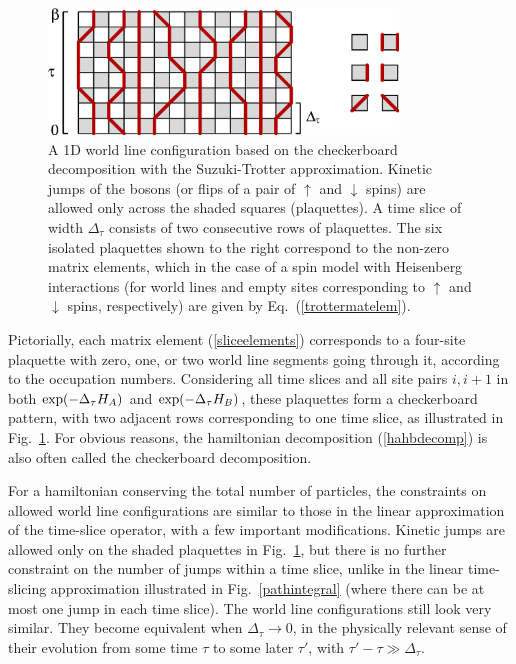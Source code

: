 \documentclass[draft,numberedheadings]{aipproc}
\newcommand{\dn}{\downarrow}
\newcommand{\up}{\uparrow}
\begin{document}
\begin{figure}
\includegraphics[width=9.3cm]{checkerboard.eps}
\caption{A 1D world line configuration based on the checkerboard decomposition with the Suzuki-Trotter approximation. Kinetic jumps of the bosons (or flips
of a pair of $\up$ and $\dn$ spins) are allowed only across the shaded squares (plaquettes). A time slice of width $\Delta_\tau$ consists of two consecutive 
rows of plaquettes. The six isolated plaquettes shown to the right correspond to the non-zero matrix elements, which in the case of a spin model with Heisenberg 
interactions (for world lines and empty sites corresponding to $\up$ and $\dn$ spins, respectively) are given by Eq.~(\ref{trottermatelem}).}
\label{checkerboard}
\end{figure}

Pictorially, each matrix element (\ref{sliceelements}) corresponds to a four-site plaquette with zero, one, or two world line segments going through it, according 
to the occupation numbers. Considering all time slices and all site pairs $i,i+1$ in both ${\rm exp}{(-\Delta_\tau H_A)}$ and ${\rm exp}{(-\Delta_\tau H_B)}$, these 
plaquettes form a checkerboard pattern, with two adjacent rows corresponding to one time slice, as illustrated in Fig.~\ref{checkerboard}. For obvious reasons, the 
hamiltonian decomposition (\ref{hahbdecomp}) is also often called the checkerboard decomposition. 

For a hamiltonian conserving the total number of particles, the constraints on allowed world line configurations are similar to those in the linear approximation 
of the time-slice operator, with a few important modifications. Kinetic jumps are allowed only on the shaded plaquettes in Fig.~\ref{checkerboard}, but there is 
no further constraint on the number of jumps within a time slice, unlike in the linear time-slicing approximation illustrated in 
Fig.~\ref{pathintegral} (where there can be at most one jump in each time slice). The world line configurations still look very similar. They become equivalent 
when $\Delta_\tau \to 0$, in the physically relevant sense of their evolution from some time $\tau$ to some later $\tau'$, with $\tau'-\tau \gg  \Delta_\tau$.
\end{document}

